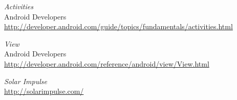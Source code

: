 \begin{thebibliography}{widest-label}
	\emph{Activities}\\
	Android Developers\\
	\url{http://developer.android.com/guide/topics/fundamentals/activities.html}
	
	\emph{View}\\
	Android Developers\\
	\url{http://developer.android.com/reference/android/view/View.html}

	\emph{Solar Impulse}\\
	\url{http://solarimpulse.com/}

\end{thebibliography}
